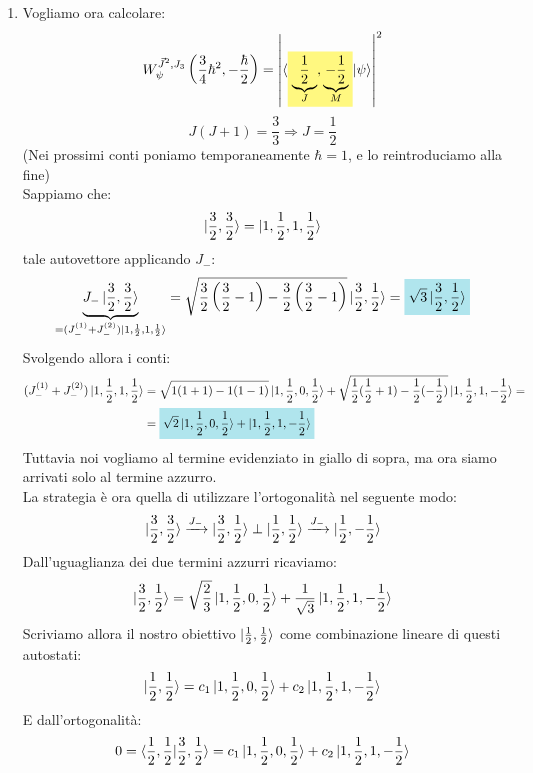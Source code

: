 \documentclass[../../FisicaTeorica.tex]{subfiles}
\begin{document}
\begin{enumerate}
\item Vogliamo ora calcolare:
\[
W_\psi^{\vec{J}^2, J_3}\left(\frac{3}{4}\hbar^2, -\frac{\hbar}{2}\right) =\left | \braket{\hlc{Yellow}{\underbrace{\frac{1}{2}}_{J}, \underbrace{-\frac{1}{2}}_{M}}|\psi}\right|^2
\]
\[
J(J+1)=\frac{3}{3}\Rightarrow J=\frac{1}{2}
\]
(Nei prossimi conti poniamo temporaneamente $\hbar=1$, e lo reintroduciamo alla fine)\\
Sappiamo che:
\[
\ket{\frac{3}{2}, \frac{3}{2}} =\ket{1, \frac{1}{2},1,\frac{1}{2}}
\]
 tale autovettore applicando $J_-$:
\[
\underbrace{J_- \ket{\frac{3}{2}, \frac{3}{2}}}_{=(J_-^{(1)}+J_-^{(2)})\ket{1,\frac{1}{2},1,\frac{1}{2}}} = \sqrt{\frac{3}{2}\left(\frac{3}{2}-1\right)-\frac{3}{2}\left(\frac{3}{2}-1 \right)}\ket{\frac{3}{2},\frac{1}{2}} = \hlc{SkyBlue}{\sqrt{3}\ket{\frac{3}{2},\frac{1}{2}}}
\]
Svolgendo allora i conti:
\begin{align*}
(J_-^{(1)} +J_-^{(2)})\ket{1,\frac{1}{2},1,\frac{1}{2}} &= \sqrt{1(1+1)-1(1-1)}\ket{1,\frac{1}{2},0,\frac{1}{2}} + \sqrt{\frac{1}{2}(\frac{1}{2}+1)-\frac{1}{2}(-\frac{1}{2})}\ket{1,\frac{1}{2},1,-\frac{1}{2}}=\\
&=\hlc{SkyBlue}{ \sqrt{2}\ket{1,\frac{1}{2},0,\frac{1}{2}}+\ket{1,\frac{1}{2},1, -\frac{1}{2}}}
\end{align*}
Tuttavia noi vogliamo  al termine evidenziato in giallo di sopra, ma ora siamo arrivati solo al termine azzurro.\\
La strategia è ora quella di utilizzare l'ortogonalità nel seguente modo:
\[
\ket{\frac{3}{2}, \frac{3}{2}} \xrightarrow{J_-} \ket{\frac{3}{2},\frac{1}{2}} \perp \ket{\frac{1}{2},\frac{1}{2}} \xrightarrow{J_-} \ket{\frac{1}{2},-\frac{1}{2}}
\]
Dall'uguaglianza dei due termini azzurri ricaviamo:
\[
\ket{\frac{3}{2},\frac{1}{2}}=\sqrt{\frac{2}{3}}\ket{1,\frac{1}{2},0,\frac{1}{2}} +\frac{1}{\sqrt{3}}\ket{1,\frac{1}{2},1,-\frac{1}{2}}
\]
Scriviamo allora il nostro obiettivo $\ket{\frac{1}{2},\frac{1}{2}}$ come combinazione lineare di questi autostati:
\[
\ket{\frac{1}{2},\frac{1}{2}}=c_1\ket{1,\frac{1}{2},0,\frac{1}{2}}+c_2\ket{1,\frac{1}{2},1,-\frac{1}{2}}
\]
E dall'ortogonalità:
\[
0=\braket{\frac{1}{2},\frac{1}{2}|\frac{3}{2},\frac{1}{2}} = c_1 \ket{1,\frac{1}{2},0,\frac{1}{2}} + c_2\ket{1,\frac{1}{2},1,-\frac{1}{2}}
\]


\end{enumerate}
\end{document}
